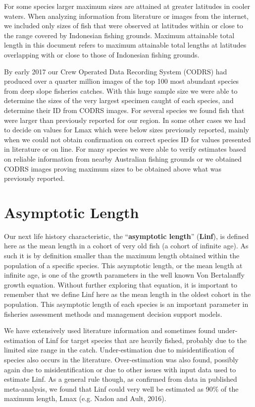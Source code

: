 For some species larger maximum sizes are attained at greater latitudes in cooler waters. When analyzing information from literature or images from the internet, we included only sizes of fish that were observed at latitudes within or close to the range covered by Indonesian fishing grounds. Maximum attainable total length in this document refers to maximum attainable total lengths at latitudes overlapping with or close to those of Indonesian fishing grounds.

By early 2017 our Crew Operated Data Recording System (CODRS) had produced over a quarter million images of the top 100 most abundant species from deep slope fisheries catches. With this huge sample size we were able to determine the sizes of the very largest specimen caught of each species, and determine their ID from CODRS images. For several species we found fish that were larger than previously reported for our region. In some other cases we had to decide on values for Lmax which were below sizes previously reported, mainly when we could not obtain confirmation on correct species ID for values presented in literature or on line. For many species we were able to verify estimates based on reliable information from nearby Australian fishing grounds or we obtained CODRS images proving maximum sizes to be obtained above what was previously reported.

\section{Asymptotic Length}
Our next life history characteristic, the ``\textbf{asymptotic length}'' (\textbf{Linf}), is defined here as the mean length in a cohort of very old fish (a cohort of infinite age). As such it is by definition smaller than the maximum length obtained within the population of a specific species. This asymptotic length, or the mean length at infinite age, is one of the growth parameters in the well known Von Bertalanffy growth equation. Without further exploring that equation, it is important to remember that we define Linf here as the mean length in the oldest cohort in the population. This asymptotic length of each species is an important parameter in fisheries assessment methods and management decision support models.

We have extensively used literature information and sometimes found under-estimation of Linf for target species that are heavily fished, probably due to the limited size range in the catch. Under-estimation due to misidentification of species also occurs in the literature. Over-estimation was also found, possibly again due to misidentification or due to other issues with input data used to estimate Linf. As a general rule though, as confirmed from data in published meta-analysis, we found that Linf could very well be estimated as 90\% of the maximum length, Lmax (e.g. Nadon and Ault, 2016).

